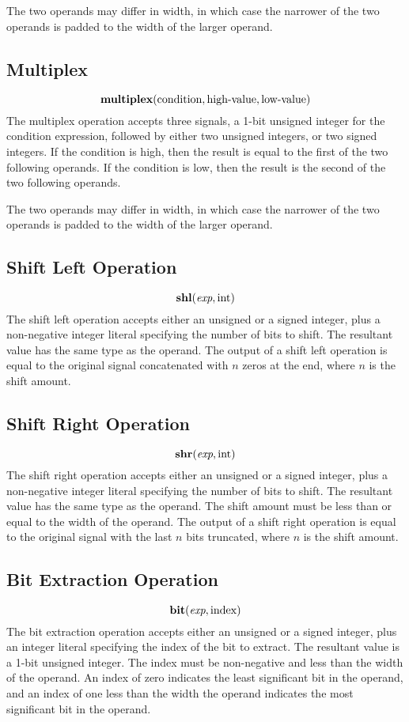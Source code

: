 \documentclass[12pt]{article}
\begin{document}
The two operands may differ in width, in which case the narrower of the two operands is padded to the width of the larger operand.

\subsection{Multiplex}
\[
\text{\bf multiplex}(\text{condition}, \text{high-value}, \text{low-value}) 
\]
The multiplex operation accepts three signals, a 1-bit unsigned integer for the condition expression, followed by either two unsigned integers, or two signed integers. If the condition is high, then the result is equal to the first of the two following operands. If the condition is low, then the result is the second of the two following operands. 

The two operands may differ in width, in which case the narrower of the two operands is padded to the width of the larger operand. 

\subsection{Shift Left Operation}
\[
\text{\bf shl}(\text{\em exp}, \text{int})
\]
The shift left operation accepts either an unsigned or a signed integer, plus a non-negative integer literal specifying the number of bits to shift. The resultant value has the same type as the operand. The output of a shift left operation is equal to the original signal concatenated with $n$ zeros at the end, where $n$ is the shift amount.

\subsection{Shift Right Operation}
\[
\text{\bf shr}(\text{\em exp}, \text{int})
\]
The shift right operation accepts either an unsigned or a signed integer, plus a non-negative integer literal specifying the number of bits to shift. The resultant value has the same type as the operand. The shift amount must be less than or equal to the width of the operand. The output of a shift right operation is equal to the original signal with the last $n$ bits truncated, where $n$ is the shift amount.

\subsection{Bit Extraction Operation}
\[
\text{\bf bit}(\text{\em exp}, \text{index})
\]
The bit extraction operation accepts either an unsigned or a signed integer, plus an integer literal specifying the index of the bit to extract. The resultant value is a 1-bit unsigned integer. The index must be non-negative and less than the width of the operand. An index of zero indicates the least significant bit in the operand, and an index of one less than the width the operand indicates the most significant bit in the operand.
\end{document}

